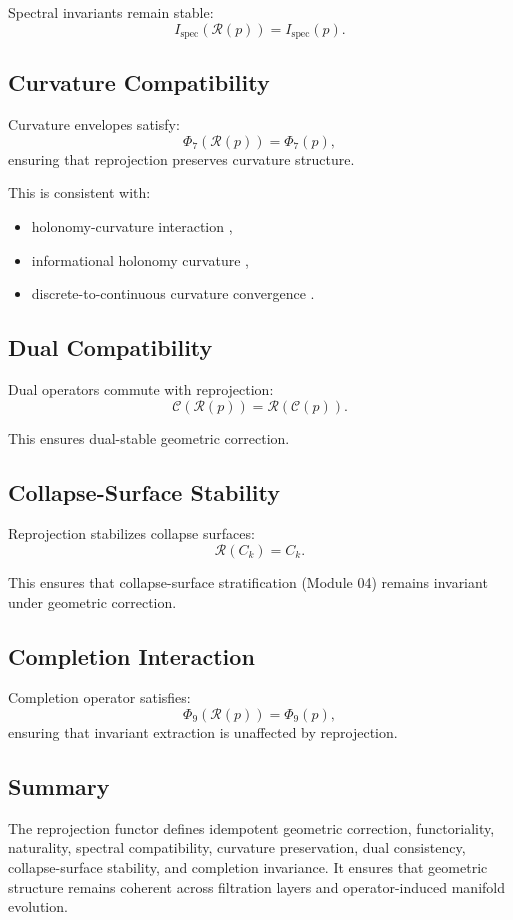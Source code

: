 Spectral invariants remain stable:
\[
I_{\mathrm{spec}}(\mathcal{R}(p)) = I_{\mathrm{spec}}(p).
\]

\subsection{Curvature Compatibility}
Curvature envelopes satisfy:
\[
\Phi_7(\mathcal{R}(p)) = \Phi_7(p),
\]
ensuring that reprojection preserves curvature structure.

This is consistent with:
\begin{itemize}
    \item holonomy-curvature interaction ,
    \item informational holonomy curvature ,
    \item discrete-to-continuous curvature convergence .
\end{itemize}

\subsection{Dual Compatibility}
Dual operators commute with reprojection:
\[
\mathcal{C}(\mathcal{R}(p)) = \mathcal{R}(\mathcal{C}(p)).
\]

This ensures dual-stable geometric correction.

\subsection{Collapse-Surface Stability}
Reprojection stabilizes collapse surfaces:
\[
\mathcal{R}(C_k) = C_k.
\]

This ensures that collapse-surface stratification (Module 04) remains invariant
under geometric correction.

\subsection{Completion Interaction}
Completion operator satisfies:
\[
\Phi_9(\mathcal{R}(p)) = \Phi_9(p),
\]
ensuring that invariant extraction is unaffected by reprojection.

\subsection{Summary}
The reprojection functor defines idempotent geometric correction, functoriality,
naturality, spectral compatibility, curvature preservation, dual consistency,
collapse-surface stability, and completion invariance. It ensures that geometric
structure remains coherent across filtration layers and operator-induced
manifold evolution.

